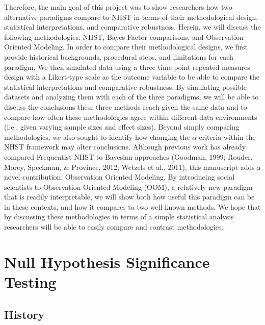 \documentclass[,man, mask]{apa6}
\begin{document}
Therefore, the main goal of this project was to show researchers how two alternative paradigms compare to NHST in terms of their methodological design, statistical interpretations, and comparative robustness. Herein, we will discuss the following methodologies: NHST, Bayes Factor comparisons, and Observation Oriented Modeling. In order to compare their methodological designs, we first provide historical backgrounds, procedural steps, and limitations for each paradigm. We then simulated data using a three time point repeated measures design with a Likert-type scale as the outcome variable to be able to compare the statistical interpretations and comparative robustness. By simulating possible datasets and analyzing them with each of the three paradigms, we will be able to discuss the conclusions these three methods reach given the same data and to compare how often these methodologies agree within different data environments (i.e., given varying sample sizes and effect sizes). Beyond simply comparing methodologies, we also sought to identify how changing the \(\alpha\) criteria within the NHST framework may alter conclusions. Although previous work has already compared Frequentist NHST to Bayesian approaches (Goodman, 1999; Rouder, Morey, Speckman, \& Province, 2012; Wetzels et al., 2011), this manuscript adds a novel contribution: Observation Oriented Modeling. By introducing social scientists to Observation Oriented Modeling (OOM), a relatively new paradigm that is readily interpretable, we will show both how useful this paradigm can be in these contexts, and how it compares to two well-known methods. We hope that by discussing these methodologies in terms of a simple statistical analysis researchers will be able to easily compare and contrast methodologies.
\newline
\newline

\hypertarget{null-hypothesis-significance-testing}{%
\section{Null Hypothesis Significance Testing}\label{null-hypothesis-significance-testing}}

\hypertarget{history}{%
\subsection{History}\label{history}}
\end{document}
